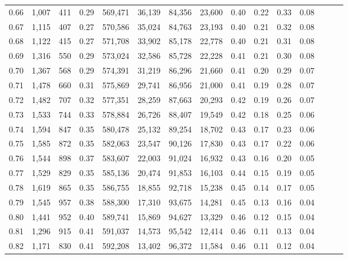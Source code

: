 \begin{tabular}{rrrrrrrrrrrrrrr}
0.66 &   1,007 &    411 &  0.29 &  569,471 &   36,139 &   84,356 &   23,600 &  0.40 &  0.22 &  0.33 &      0.08 \\
0.67 &   1,115 &    407 &  0.27 &  570,586 &   35,024 &   84,763 &   23,193 &  0.40 &  0.21 &  0.32 &      0.08 \\
0.68 &   1,122 &    415 &  0.27 &  571,708 &   33,902 &   85,178 &   22,778 &  0.40 &  0.21 &  0.31 &      0.08 \\
0.69 &   1,316 &    550 &  0.29 &  573,024 &   32,586 &   85,728 &   22,228 &  0.41 &  0.21 &  0.30 &      0.08 \\
0.70 &   1,367 &    568 &  0.29 &  574,391 &   31,219 &   86,296 &   21,660 &  0.41 &  0.20 &  0.29 &      0.07 \\
0.71 &   1,478 &    660 &  0.31 &  575,869 &   29,741 &   86,956 &   21,000 &  0.41 &  0.19 &  0.28 &      0.07 \\
0.72 &   1,482 &    707 &  0.32 &  577,351 &   28,259 &   87,663 &   20,293 &  0.42 &  0.19 &  0.26 &      0.07 \\
0.73 &   1,533 &    744 &  0.33 &  578,884 &   26,726 &   88,407 &   19,549 &  0.42 &  0.18 &  0.25 &      0.06 \\
0.74 &   1,594 &    847 &  0.35 &  580,478 &   25,132 &   89,254 &   18,702 &  0.43 &  0.17 &  0.23 &      0.06 \\
0.75 &   1,585 &    872 &  0.35 &  582,063 &   23,547 &   90,126 &   17,830 &  0.43 &  0.17 &  0.22 &      0.06 \\
0.76 &   1,544 &    898 &  0.37 &  583,607 &   22,003 &   91,024 &   16,932 &  0.43 &  0.16 &  0.20 &      0.05 \\
0.77 &   1,529 &    829 &  0.35 &  585,136 &   20,474 &   91,853 &   16,103 &  0.44 &  0.15 &  0.19 &      0.05 \\
0.78 &   1,619 &    865 &  0.35 &  586,755 &   18,855 &   92,718 &   15,238 &  0.45 &  0.14 &  0.17 &      0.05 \\
0.79 &   1,545 &    957 &  0.38 &  588,300 &   17,310 &   93,675 &   14,281 &  0.45 &  0.13 &  0.16 &      0.04 \\
0.80 &   1,441 &    952 &  0.40 &  589,741 &   15,869 &   94,627 &   13,329 &  0.46 &  0.12 &  0.15 &      0.04 \\
0.81 &   1,296 &    915 &  0.41 &  591,037 &   14,573 &   95,542 &   12,414 &  0.46 &  0.11 &  0.13 &      0.04 \\
0.82 &   1,171 &    830 &  0.41 &  592,208 &   13,402 &   96,372 &   11,584 &  0.46 &  0.11 &  0.12 &      0.04 \\

\end{tabular}
